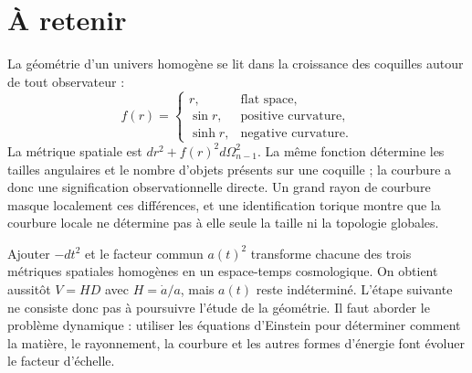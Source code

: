 \begin{classroomqa}
\end{classroomqa}

\begin{classroomqa}
\end{classroomqa}

\section{À retenir}

La géométrie d’un univers homogène se lit dans la croissance des coquilles autour de tout observateur :
\begin{equation}
f(r)=
\begin{cases}
r, & \text{flat space},\\
\sin r, & \text{positive curvature},\\
\sinh r, & \text{negative curvature}.
\end{cases}
\end{equation}
La métrique spatiale est \(dr^2+f(r)^2d\Omega_{n-1}^2\). La même fonction détermine les tailles angulaires et le nombre d’objets présents sur une coquille ; la courbure a donc une signification observationnelle directe. Un grand rayon de courbure masque localement ces différences, et une identification torique montre que la courbure locale ne détermine pas à elle seule la taille ni la topologie globales.

Ajouter \(-dt^2\) et le facteur commun \(a(t)^2\) transforme chacune des trois métriques spatiales homogènes en un espace-temps cosmologique. On obtient aussitôt \(V=HD\) avec \(H=\dot a/a\), mais \(a(t)\) reste indéterminé. L’étape suivante ne consiste donc pas à poursuivre l’étude de la géométrie. Il faut aborder le problème dynamique : utiliser les équations d’Einstein pour déterminer comment la matière, le rayonnement, la courbure et les autres formes d’énergie font évoluer le facteur d’échelle.
